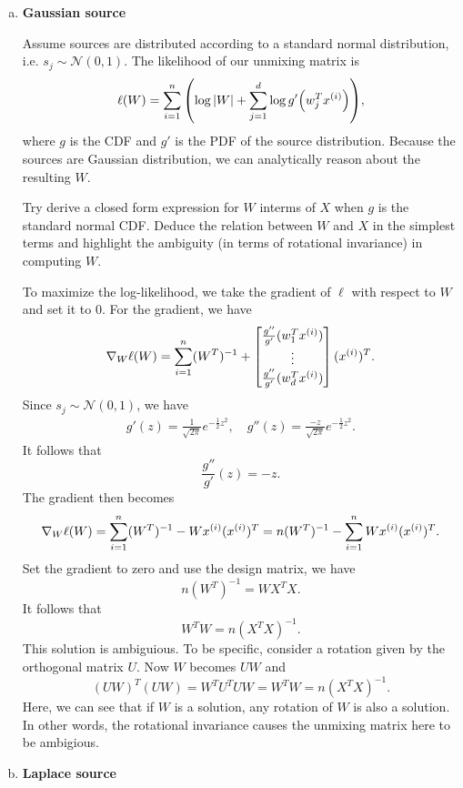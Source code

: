 \documentclass[12pt,letterpaper,boxed]{hmcpset}
\begin{document}
\begin{solution}
  \begin{enumerate}[(a)]
    \item \textbf{Gaussian source}
    
    Assume sources are distributed according to a standard normal distribution, i.e. $s_j \sim \mathcal{N}(0,1)$. The likelihood of our unmixing matrix is
    \[
    \ell(W) = \sum_{i=1}^n \qty(\log \abs{W} + \sum_{j=1}^d \log g' \qty(w_j^T \xx)),
    \]
    where $g$ is the CDF and $g'$ is the PDF of the source distribution. Because the sources are Gaussian distribution, we can analytically reason about the resulting $W$.

    Try derive a closed form expression for $W$ interms of $X$ when $g$ is the standard normal CDF. Deduce the relation between $W$ and $X$ in the simplest terms and highlight the ambiguity (in terms of rotational invariance) in computing $W$.

    To maximize the log-likelihood, we take the gradient of $\ell$ with respect to $W$ and set it to $0$. For the gradient, we have
    \[
    \nabla_W \ell(W) = \sum_{i=1}^n (W^{T})^{-1} + \begin{bmatrix}
      \frac{g''}{g'} (w_1^T \xx) \\
      \vdots \\
      \frac{g''}{g'} (w_d^T \xx)
    \end{bmatrix}
    (\xx)^T.
    \]
    Since $s_j \sim \mathcal N(0,1)$, we have
    \[
    \begin{aligned}
      g'(z) = \frac{1}{\sqrt{2\pi}} e^{-\frac{1}{2} z^2}, \quad
      g''(z) = \frac{-z}{\sqrt{2\pi}} e^{-\frac{1}{2} z^2}.
    \end{aligned}
    \]
    It follows that
    \[
    \frac{g''}{g'}(z) = -z.
    \]
    The gradient then becomes
    \[
    \nabla_W \ell(W) = \sum_{i=1}^n (W^{T})^{-1} - W \xx (\xx)^T = n (W^{T})^{-1} - \sum_{i=1}^n W \xx (\xx)^T.
    \]
    Set the gradient to zero and use the design matrix, we have
    \[
    n (W^T)^{-1} = W X^T X.
    \]
    It follows that 
    \[
    W^T W = n (X^T X)^{-1}.
    \]
    This solution is ambiguious. To be specific, consider a rotation given by the orthogonal matrix $U$. Now $W$ becomes $UW$ and 
    \[
    (UW)^T (UW) = W^T U^T U W = W^T W = n (X^T X)^{-1}.
    \]
    Here, we can see that if $W$ is a solution, any rotation of $W$ is also a solution. In other words, the rotational invariance causes the unmixing matrix here to be ambigious.

    \item \textbf{Laplace source}
    

\end{enumerate}
\end{solution}
\end{document}
